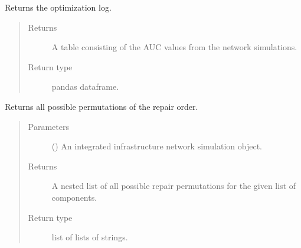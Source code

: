 \documentclass[letterpaper,10pt,english]{sphinxmanual}
\begin{document}
\begin{fulllineitems}
\begin{fulllineitems}
\label{\detokenize{apidoc:dreaminsg_integrated_model.src.optimizer.BruteForceOptimizer.get_optimization_log}}
\sphinxAtStartPar
Returns the optimization log.
\begin{quote}\begin{description}
\item[{Returns}] \leavevmode
\sphinxAtStartPar
A table consisting of the AUC values from the network simulations.

\item[{Return type}] \leavevmode
\sphinxAtStartPar
pandas dataframe.

\end{description}\end{quote}

\end{fulllineitems}


\begin{fulllineitems}
\label{\detokenize{apidoc:dreaminsg_integrated_model.src.optimizer.BruteForceOptimizer.get_repair_permutations}}
\sphinxAtStartPar
Returns all possible permutations of the repair order.
\begin{quote}\begin{description}
\item[{Parameters}] \leavevmode
\sphinxAtStartPar
{} () \textendash{} An integrated infrastructure network simulation object.

\item[{Returns}] \leavevmode
\sphinxAtStartPar
A nested list of all possible repair permutations for the given list of components.

\item[{Return type}] \leavevmode
\sphinxAtStartPar
list of lists of strings.

\end{description}\end{quote}

\end{fulllineitems}


\end{fulllineitems}
\end{document}
